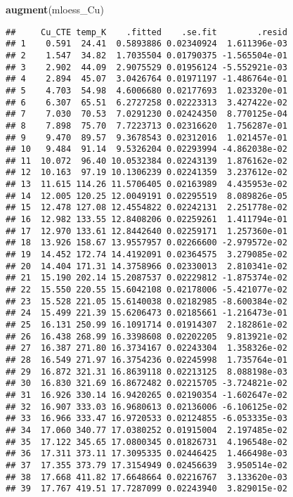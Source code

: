 \documentclass[]{book}
\newenvironment{Shaded}{\begin{snugshade}}{\end{snugshade}}
\newcommand{\KeywordTok}[1]{\textcolor[rgb]{0.13,0.29,0.53}{\textbf{#1}}}
\newcommand{\NormalTok}[1]{#1}
\theoremstyle{definition}
\theoremstyle{definition}
\theoremstyle{definition}
\theoremstyle{remark}
\begin{document}
\begin{Shaded}
\begin{Highlighting}[]
\KeywordTok{augment}\NormalTok{(mloess_Cu)}
\end{Highlighting}
\end{Shaded}

\begin{verbatim}
##     Cu_CTE temp_K    .fitted    .se.fit        .resid
## 1    0.591  24.41  0.5893886 0.02340924  1.611396e-03
## 2    1.547  34.82  1.7035504 0.01790375 -1.565504e-01
## 3    2.902  44.09  2.9075529 0.01956124 -5.552921e-03
## 4    2.894  45.07  3.0426764 0.01971197 -1.486764e-01
## 5    4.703  54.98  4.6006680 0.02177693  1.023320e-01
## 6    6.307  65.51  6.2727258 0.02223313  3.427422e-02
## 7    7.030  70.53  7.0291230 0.02424350  8.770125e-04
## 8    7.898  75.70  7.7223713 0.02316620  1.756287e-01
## 9    9.470  89.57  9.3678543 0.02312016  1.021457e-01
## 10   9.484  91.14  9.5326204 0.02293994 -4.862038e-02
## 11  10.072  96.40 10.0532384 0.02243139  1.876162e-02
## 12  10.163  97.19 10.1306239 0.02241359  3.237612e-02
## 13  11.615 114.26 11.5706405 0.02163989  4.435953e-02
## 14  12.005 120.25 12.0049191 0.02295519  8.089826e-05
## 15  12.478 127.08 12.4554822 0.02242131  2.251778e-02
## 16  12.982 133.55 12.8408206 0.02259261  1.411794e-01
## 17  12.970 133.61 12.8442640 0.02259171  1.257360e-01
## 18  13.926 158.67 13.9557957 0.02266600 -2.979572e-02
## 19  14.452 172.74 14.4192091 0.02364575  3.279085e-02
## 20  14.404 171.31 14.3758966 0.02330013  2.810341e-02
## 21  15.190 202.14 15.2087537 0.02229812 -1.875374e-02
## 22  15.550 220.55 15.6042108 0.02178006 -5.421077e-02
## 23  15.528 221.05 15.6140038 0.02182985 -8.600384e-02
## 24  15.499 221.39 15.6206473 0.02185661 -1.216473e-01
## 25  16.131 250.99 16.1091714 0.01914307  2.182861e-02
## 26  16.438 268.99 16.3398608 0.02202205  9.813921e-02
## 27  16.387 271.80 16.3734167 0.02243304  1.358326e-02
## 28  16.549 271.97 16.3754236 0.02245998  1.735764e-01
## 29  16.872 321.31 16.8639118 0.02213125  8.088198e-03
## 30  16.830 321.69 16.8672482 0.02215705 -3.724821e-02
## 31  16.926 330.14 16.9420265 0.02190354 -1.602647e-02
## 32  16.907 333.03 16.9680613 0.02136006 -6.106125e-02
## 33  16.966 333.47 16.9720533 0.02124855 -6.053335e-03
## 34  17.060 340.77 17.0380252 0.01915004  2.197485e-02
## 35  17.122 345.65 17.0800345 0.01826731  4.196548e-02
## 36  17.311 373.11 17.3095335 0.02446425  1.466498e-03
## 37  17.355 373.79 17.3154949 0.02456639  3.950514e-02
## 38  17.668 411.82 17.6648664 0.02216767  3.133620e-03
## 39  17.767 419.51 17.7287099 0.02243940  3.829015e-02

\end{verbatim}
\end{document}
